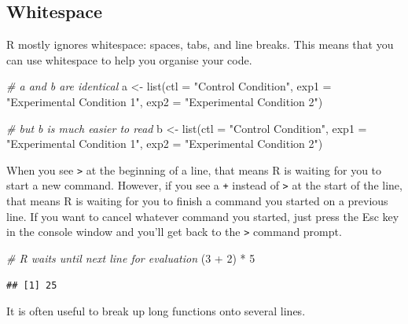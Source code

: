 \documentclass[
  oneside]{book}
\newenvironment{Shaded}{\begin{snugshade}}{\end{snugshade}}
\newcommand{\AttributeTok}[1]{\textcolor[rgb]{0.77,0.63,0.00}{#1}}
\newcommand{\CommentTok}[1]{\textcolor[rgb]{0.56,0.35,0.01}{\textit{#1}}}
\newcommand{\DecValTok}[1]{\textcolor[rgb]{0.00,0.00,0.81}{#1}}
\newcommand{\FunctionTok}[1]{\textcolor[rgb]{0.00,0.00,0.00}{#1}}
\newcommand{\NormalTok}[1]{#1}
\newcommand{\OtherTok}[1]{\textcolor[rgb]{0.56,0.35,0.01}{#1}}
\newcommand{\SpecialCharTok}[1]{\textcolor[rgb]{0.00,0.00,0.00}{#1}}
\newcommand{\StringTok}[1]{\textcolor[rgb]{0.31,0.60,0.02}{#1}}
\begin{document}
\hypertarget{whitespace}{%
\subsection{Whitespace}\label{whitespace}}

R mostly ignores whitespace: spaces, tabs, and line breaks. This means that you can use whitespace to help you organise your code.

\begin{Shaded}
\begin{Highlighting}[]
\CommentTok{\# a and b are identical}
\NormalTok{a }\OtherTok{\textless{}{-}} \FunctionTok{list}\NormalTok{(}\AttributeTok{ctl =} \StringTok{"Control Condition"}\NormalTok{, }\AttributeTok{exp1 =} \StringTok{"Experimental Condition 1"}\NormalTok{, }\AttributeTok{exp2 =} \StringTok{"Experimental Condition 2"}\NormalTok{)}

\CommentTok{\# but b is much easier to read}
\NormalTok{b }\OtherTok{\textless{}{-}} \FunctionTok{list}\NormalTok{(}\AttributeTok{ctl  =} \StringTok{"Control Condition"}\NormalTok{, }
          \AttributeTok{exp1 =} \StringTok{"Experimental Condition 1"}\NormalTok{, }
          \AttributeTok{exp2 =} \StringTok{"Experimental Condition 2"}\NormalTok{)}
\end{Highlighting}
\end{Shaded}

When you see \texttt{\textgreater{}} at the beginning of a line, that means R is waiting for you to start a new command. However, if you see a \texttt{+} instead of \texttt{\textgreater{}} at the start of the line, that means R is waiting for you to finish a command you started on a previous line. If you want to cancel whatever command you started, just press the Esc key in the console window and you'll get back to the \texttt{\textgreater{}} command prompt.

\begin{Shaded}
\begin{Highlighting}[]
\CommentTok{\# R waits until next line for evaluation}
\NormalTok{(}\DecValTok{3} \SpecialCharTok{+} \DecValTok{2}\NormalTok{) }\SpecialCharTok{*}
     \DecValTok{5}
\end{Highlighting}
\end{Shaded}

\begin{verbatim}
## [1] 25
\end{verbatim}

It is often useful to break up long functions onto several lines.
\end{document}

